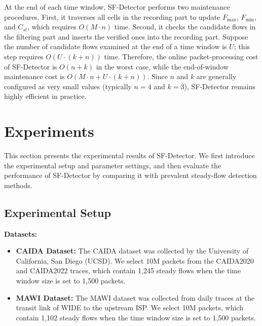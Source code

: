 \documentclass[preprint,12pt]{elsarticle}
\begin{document}
At the end of each time window, SF-Detector performs two maintenance procedures. First, it traverses all cells in the recording part to update $F_{\max}$, $F_{\min}$, and $C_{st}$, which requires $O(M \cdot n)$ time. Second, it checks the candidate flows in the filtering part and inserts the verified ones into the recording part. Suppose the number of candidate flows examined at the end of a time window is $U$; this step requires $O(U \cdot (k + n))$ time. Therefore, the online packet-processing cost of SF-Detector is $O(n + k)$ in the worst case, while the end-of-window maintenance cost is $O(M \cdot n + U \cdot (k + n))$. Since $n$ and $k$ are generally configured as very small values (typically $n = 4$ and $k = 3$), SF-Detector remains highly efficient in practice.

\section{Experiments}
This section presents the experimental results of SF-Detector. We first introduce the experimental setup and parameter settings, and then evaluate the performance of SF-Detector by comparing it with prevalent steady-flow detection methods.

\subsection{Experimental Setup}

\textbf{Datasets:}
\begin{itemize}
    \item \textbf{CAIDA Dataset:} The CAIDA dataset \cite{b30} was collected by the University of California, San Diego (UCSD). We select 10M packets from the CAIDA2020 and CAIDA2022 traces, which contain 1,245 steady flows when the time window size is set to 1,500 packets.
    \item \textbf{MAWI Dataset:} The MAWI dataset \cite{b31} was collected from daily traces at the transit link of WIDE to the upstream ISP. We select 10M packets, which contain 1,102 steady flows when the time window size is set to 1,500 packets.
\end{itemize}
\end{document}
